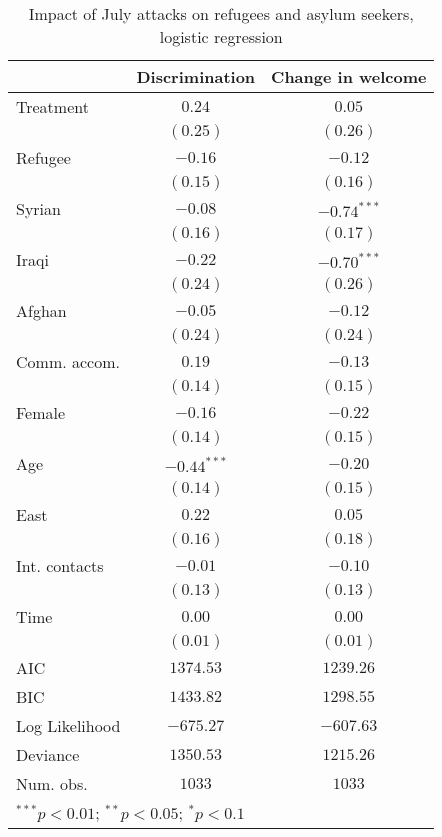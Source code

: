 
\begin{table}
\caption{Impact of July attacks on refugees and asylum seekers, logistic regression}
\begin{center}
\begin{tabular}{l c c}
\toprule
 & Discrimination & Change in welcome \\
\midrule
Treatment      & $0.24$        & $0.05$        \\
               & $(0.25)$      & $(0.26)$      \\
Refugee        & $-0.16$       & $-0.12$       \\
               & $(0.15)$      & $(0.16)$      \\
Syrian         & $-0.08$       & $-0.74^{***}$ \\
               & $(0.16)$      & $(0.17)$      \\
Iraqi          & $-0.22$       & $-0.70^{***}$ \\
               & $(0.24)$      & $(0.26)$      \\
Afghan         & $-0.05$       & $-0.12$       \\
               & $(0.24)$      & $(0.24)$      \\
Comm. accom.   & $0.19$        & $-0.13$       \\
               & $(0.14)$      & $(0.15)$      \\
Female         & $-0.16$       & $-0.22$       \\
               & $(0.14)$      & $(0.15)$      \\
Age            & $-0.44^{***}$ & $-0.20$       \\
               & $(0.14)$      & $(0.15)$      \\
East           & $0.22$        & $0.05$        \\
               & $(0.16)$      & $(0.18)$      \\
Int. contacts  & $-0.01$       & $-0.10$       \\
               & $(0.13)$      & $(0.13)$      \\
Time           & $0.00$        & $0.00$        \\
               & $(0.01)$      & $(0.01)$      \\
\midrule
AIC            & $1374.53$     & $1239.26$     \\
BIC            & $1433.82$     & $1298.55$     \\
Log Likelihood & $-675.27$     & $-607.63$     \\
Deviance       & $1350.53$     & $1215.26$     \\
Num. obs.      & $1033$        & $1033$        \\
\bottomrule
\multicolumn{3}{l}{\scriptsize{$^{***}p<0.01$; $^{**}p<0.05$; $^{*}p<0.1$}}
\end{tabular}
\label{tab_host_glm}
\end{center}
\end{table}
